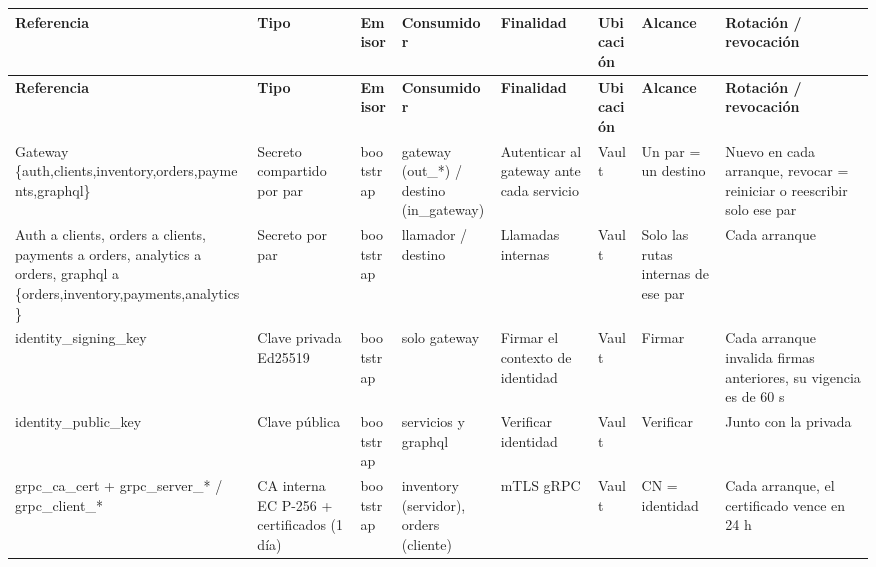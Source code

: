 \documentclass[10pt,letterpaper]{article}
\begin{document}
\begin{landscape}
{\scriptsize
\begin{longtable}{|P{\tabcolsep\relax}|P{\tabcolsep\relax}|P{\tabcolsep\relax}|P{\tabcolsep\relax}|P{\tabcolsep\relax}|P{\tabcolsep\relax}|P{\tabcolsep\relax}|P{\tabcolsep\relax}|}
\hline
\textbf{Referencia} & \textbf{Tipo} & \textbf{Emisor} & \textbf{Consumidor} & \textbf{Finalidad} & \textbf{Ubicación} & \textbf{Alcance} & \textbf{Rotación /\allowbreak{} revocación} \\ \hline
\endfirsthead
\hline
\textbf{Referencia} & \textbf{Tipo} & \textbf{Emisor} & \textbf{Consumidor} & \textbf{Finalidad} & \textbf{Ubicación} & \textbf{Alcance} & \textbf{Rotación /\allowbreak{} revocación} \\ \hline
\endhead
Gateway \{auth,\allowbreak{}clients,\allowbreak{}inventory,\allowbreak{}orders,\allowbreak{}payments,\allowbreak{}graphql\} & Secreto compartido por par  & bootstrap & gateway (out\_\allowbreak{}*) /\allowbreak{} destino (in\_\allowbreak{}gateway) & Autenticar al gateway ante cada servicio & Vault & Un par = un destino & Nuevo en cada arranque, revocar = reiniciar o reescribir solo ese par \\ \hline
Auth a clients, orders a clients, payments a orders, analytics a orders, graphql a \{orders,\allowbreak{}inventory,\allowbreak{}payments,\allowbreak{}analytics\} & Secreto por par & bootstrap & llamador /\allowbreak{} destino & Llamadas internas & Vault & Solo las rutas internas de ese par & Cada arranque \\ \hline
identity\_\allowbreak{}signing\_\allowbreak{}key & Clave privada Ed25519 & bootstrap & solo gateway & Firmar el contexto de identidad & Vault & Firmar & Cada arranque invalida firmas anteriores, su vigencia es de 60 s \\ \hline
identity\_\allowbreak{}public\_\allowbreak{}key & Clave pública & bootstrap & servicios y graphql & Verificar identidad & Vault & Verificar & Junto con la privada \\ \hline
grpc\_\allowbreak{}ca\_\allowbreak{}cert + grpc\_\allowbreak{}server\_\allowbreak{}* /\allowbreak{} grpc\_\allowbreak{}client\_\allowbreak{}* & CA interna EC P-256 + certificados (1 día) & bootstrap & inventory (servidor), orders (cliente) & mTLS gRPC & Vault & CN = identidad & Cada arranque, el certificado vence en 24 h \\ \hline

\end{longtable}}
\end{landscape}
\end{document}
